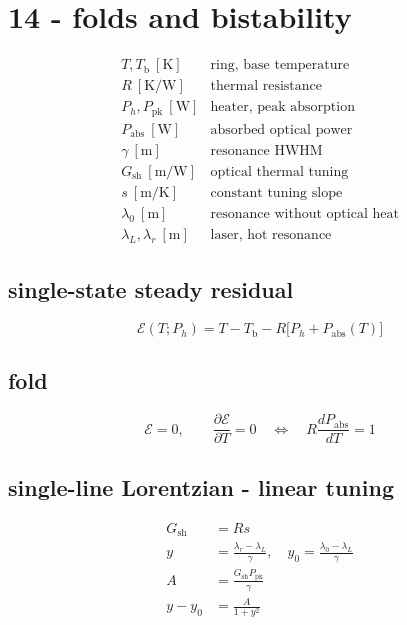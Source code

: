 \section*{14 - folds and bistability}

\[
\begin{array}{ll}T,T_{\mathrm b}\ [\mathrm K]&\text{ring, base temperature}\\[0.6em]R\ [\mathrm{K/W}]&\text{thermal resistance}\\[0.6em]P_h,P_{\mathrm{pk}}\ [\mathrm W]&\text{heater, peak absorption}\\[0.6em]P_{\mathrm{abs}}\ [\mathrm W]&\text{absorbed optical power}\\[0.6em]\gamma\ [\mathrm m]&\text{resonance HWHM}\\[0.6em]G_{\mathrm{sh}}\ [\mathrm{m/W}]&\text{optical thermal tuning}\\[0.6em]s\ [\mathrm{m/K}]&\text{constant tuning slope}\\[0.6em]\lambda_0\ [\mathrm m]&\text{resonance without optical heat}\\[0.6em]\lambda_L,\lambda_r\ [\mathrm m]&\text{laser, hot resonance}\end{array}
\]

\subsection*{single-state steady residual}
\[
\displaystyle \mathcal E(T;P_h)=T-T_{\mathrm b}-R\bigl[P_h+P_{\mathrm{abs}}(T)\bigr]
\]

\subsection*{fold}
\[
\displaystyle \mathcal E=0,\qquad\frac{\partial\mathcal E}{\partial T}=0\quad\Longleftrightarrow\quad R\frac{dP_{\mathrm{abs}}}{dT}=1
\]

\subsection*{single-line Lorentzian - linear tuning}
\[
\displaystyle \begin{aligned}G_{\mathrm{sh}}&=Rs\\y&=\frac{\lambda_r-\lambda_L}{\gamma},\quad y_0=\frac{\lambda_0-\lambda_L}{\gamma}\\A&=\frac{G_{\mathrm{sh}}P_{\mathrm{pk}}}{\gamma}\\y-y_0&=\frac{A}{1+y^2}\end{aligned}
\]

